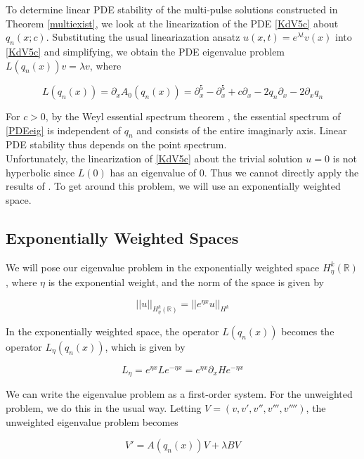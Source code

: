 \documentclass[12pt]{article}
\def\R{{\mathbb R}}
\begin{document}
To determine linear PDE stability of the multi-pulse solutions constructed in Theorem \ref{multiexist}, we look at the linearization of the PDE \eqref{KdV5c} about $q_n(x; c)$. Substituting the usual lineariazation ansatz $u(x, t) = e^{\lambda t} v(x)$ into \eqref{KdV5c} and simplifying, we obtain the PDE eigenvalue problem $L(q_n(x)) v = \lambda v$, where

\begin{equation}\label{PDEeig}
L(q_n(x)) = \partial_x A_0(q_n(x)) = \partial_x^5 - \partial_x^5 + c \partial_x - 2 q_n \partial_x - 2 \partial_x q_n  
\end{equation}

For $c > 0$, by the Weyl essential spectrum theorem \cite[Theorem 2.2.6]{Kapitula2013}, the essential spectrum of \eqref{PDEeig} is independent of $q_n$ and consists of the entire imaginarly axis. Linear PDE stability thus depends on the point spectrum. \\

Unfortunately, the linearization of \eqref{KdV5c} about the trivial solution $u = 0$ is not hyperbolic since $L(0)$ has an eigenvalue of 0. Thus we cannot directly apply the results of \cite{Sandstede1998}. To get around this problem, we will use an exponentially weighted space.

\subsection{Exponentially Weighted Spaces}\label{sec:background}

We will pose our eigenvalue problem in the exponentially weighted space $H_\eta^k(\R)$, where $\eta$ is the exponential weight, and the norm of the space is given by

\[
||u||_{H_\eta^k(\R)} = ||e^{\eta x}u||_{H^k}
\]

In the exponentially weighted space, the operator $L(q_n(x))$ becomes the operator $L_\eta(q_n(x))$, which is given by

\begin{equation}\label{Leta}
L_\eta = e^{\eta x} L e^{-\eta x} = e^{\eta x} \partial_x H e^{-\eta x}
\end{equation}

We can write the eigenvalue problem as a first-order system. For the unweighted problem, we do this in the usual way. Letting $V = (v, v', v'', v''', v'''')$, the unweighted eigenvalue problem becomes

\[
V' = A(q_n(x))V + \lambda B V
\]
\end{document}
